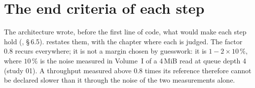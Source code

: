 \section{The end criteria of each step}\label{t2ann:sec:etapes}

The architecture wrote, before the first line of code, what would make each step hold (, \S\,6.5).  restates them, with the chapter where each is judged. The factor $0.8$ recurs everywhere; it is not a margin chosen by guesswork: it is $1 - 2 \times 10\,\%$, where $10\,\%$ is the noise measured in Volume~I of a 4\,MiB read at queue depth 4 (study 01). A throughput measured above $0.8$ times its reference therefore cannot be declared slower than it through the noise of the two measurements alone.

\begingroup\small
\renewcommand{\arraystretch}{1.12}
